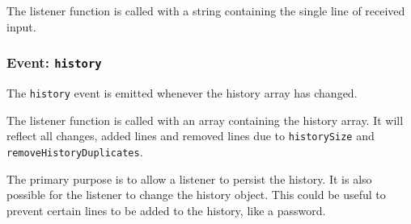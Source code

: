 The listener function is called with a string containing the single line
of received input.

\begin{Shaded}
\begin{Highlighting}[]
\NormalTok{(}\OperatorTok{,}\KeywordTok{=\textgreater{}}\NormalTok{ \{}
  \NormalTok{(}\SpecialCharTok{$\{}\SpecialCharTok{\}}\VerbatimStringTok{\textasciigrave{}}\NormalTok{)}\OperatorTok{;}
\NormalTok{\})}\OperatorTok{;}
\end{Highlighting}
\end{Shaded}

\subsubsection{\texorpdfstring{Event:
\texttt{\textquotesingle{}history\textquotesingle{}}}{Event: \textquotesingle history\textquotesingle{}}}\label{event-history}

The \texttt{\textquotesingle{}history\textquotesingle{}} event is
emitted whenever the history array has changed.

The listener function is called with an array containing the history
array. It will reflect all changes, added lines and removed lines due to
\texttt{historySize} and \texttt{removeHistoryDuplicates}.

The primary purpose is to allow a listener to persist the history. It is
also possible for the listener to change the history object. This could
be useful to prevent certain lines to be added to the history, like a
password.

\begin{Shaded}
\begin{Highlighting}[]
\NormalTok{(}\OperatorTok{,}\KeywordTok{=\textgreater{}}\NormalTok{ \{}
  \NormalTok{(}\SpecialCharTok{$\{}\SpecialCharTok{\}}\VerbatimStringTok{\textasciigrave{}}\NormalTok{)}\OperatorTok{;}
\NormalTok{\})}\OperatorTok{;}
\end{Highlighting}
\end{Shaded}

